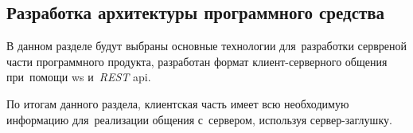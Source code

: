 \subsection{Разработка архитектуры программного средства}
\label{sec:development:arch:pp}

В данном разделе будут выбраны основные технологии для~разработки сервреной части программного продукта, разработан формат клиент-серверного общения при~помощи \gls{ws} и~\textit{REST} \gls{api}.






По итогам данного раздела, клиентская часть имеет всю необходимую информацию для~реализации общения с~сервером, используя сервер-заглушку.